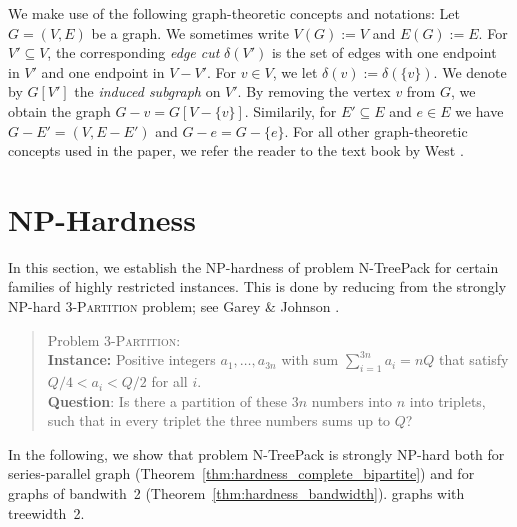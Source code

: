 \documentclass[runningheads]{llncs}
\newcommand{\set}[1]{\{ #1 \}}
\newcommand{\xxxNTP}{{\sc N-TreePack}}
\begin{document}
We make use of the following graph-theoretic concepts and notations: 
Let $G=(V,E)$ be a graph. We sometimes write $V(G):=V$ and $E(G):=E$. 
For $V'\subseteq V$, the corresponding \emph{edge cut} $\delta(V')$ is the set of edges with
one endpoint in $V'$ and one endpoint in $V-V'$. 
For $v\in V$, we let $\delta(v) := \delta(\set{v})$. 
We denote by $G[V']$ the \emph{induced subgraph} on $V'$. 
By removing the vertex $v$ from $G$, we obtain the graph $G-v=G[V-\set{v}]$. 
Similarily, for $E'\subseteq E$ and $e\in E$ we have $G-E'=(V,E-E')$ and $G-e=G-\set{e}$.
For all other graph-theoretic concepts used in the paper, we refer the reader to the
text book by West \cite{WestBook}.


\section{NP-Hardness}
\label{sec:hardness}
In this section, we establish the NP-hardness of problem {\xxxNTP} for certain families of
highly restricted instances. 
This is done by reducing from the strongly NP-hard \textsc{3-Partition} problem;
see Garey \& Johnson \cite{garey1979computers}. 
\begin{quote}
Problem \textsc{3-Partition}: 
\\
\textbf{Instance:} Positive integers $a_1,\ldots,a_{3n}$ with sum $\sum_{i=1}^{3n}a_i=nQ$ that satisfy 
$Q/4<a_i<Q/2$ for all $i$.
\\
\textbf{Question}: Is there a partition of these $3n$ numbers into $n$ into triplets, such that in 
every triplet the three numbers sums up to $Q$?  
\end{quote}
In the following, we show that problem {\xxxNTP} is strongly NP-hard both for series-parallel graph 
(Theorem~\ref{thm:hardness_complete_bipartite}) and for graphs of bandwith~2 (Theorem~\ref{thm:hardness_bandwidth}). 
graphs with treewidth~2.
\end{document}
